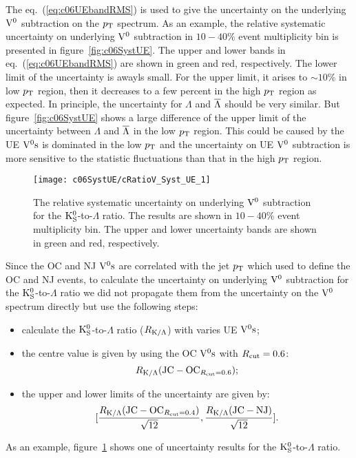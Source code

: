 The eq.~(\ref{eq:c06UEbandRMS}) is used to give the uncertainty on the underlying ${\rm V}^{0}$ subtraction on the $p_{\rm T}$ spectrum.
As an example,
the relative systematic uncertainty on underlying ${\rm V}^{0}$
subtraction in $10-40\%$ event multiplicity bin is presented
in figure~\ref{fig:c06SystUE}.
The upper and lower bands in eq.~(\ref{eq:c06UEbandRMS}) are shown
in green and red, respectively.
The lower limit of the uncertainty is awayls small.
For the upper limit, it arises to $\sim 10\%$ in low $p_{\rm T}$ region,
then it decreases to a few percent in the high $p_{\rm T}$ region as expected.
In principle, the uncertainty for $\Lambda$ and $\overline{\Lambda}$ should be
very similar.
But figure~\ref{fig:c06SystUE} shows a large difference of the upper limit
of the uncertainty between $\Lambda$ and $\overline{\Lambda}$ in the low $p_{\rm T}$ region.
This could be caused by the UE ${\rm V}^{0}{\rm s}$ is dominated in the low $p_{\rm T}$ and
the uncertainty on UE ${\rm V}^{0}$ subtraction is more sensitive to the
statistic fluctuations than that in the high $p_{\rm T}$ region.

\begin{figure}[htb]
\begin{center}
\texttt{[image: c06SystUE/cRatioV\_Syst\_UE\_1]}
\caption{The relative systematic uncertainty on underlying ${\rm V}^{0}$
         subtraction for the ${\rm K}_{\rm S}^{0}$-to-$\Lambda$ ratio.
         The results are shown in $10-40\%$ event multiplicity bin.
         The upper and lower uncertainty bands are shown in green and red,
         respectively.}
\label{fig:c06SystRatioVUE}
\end{center}
\end{figure}

Since the OC and NJ ${\rm V}^{0}{\rm s}$ are correlated with the jet $p_{\rm T}$ which used to
define the OC and NJ events,
to calculate the uncertainty on underlying ${\rm V}^{0}$ subtraction for the
${\rm K}_{\rm S}^{0}$-to-$\Lambda$ ratio we did not propagate them from the uncertainty
on the ${\rm V}^{0}$ spectrum directly but use the following steps:
\begin{itemize}
\item calculate the ${\rm K}_{\rm S}^{0}$-to-$\Lambda$ ratio ($R_{{\rm K}/\Lambda}$) with
      varies UE ${\rm V}^{0}{\rm s}$;
\item the centre value is given by using the OC ${\rm V}^{0}{\rm s}$
      with $R_{\rm cut}=0.6$:
      \begin{equation}
      R_{{\rm K}/\Lambda}({\rm JC}-{\rm OC}_{R_{\rm cut}=0.6});
      \end{equation}
\item the upper and lower limits of the uncertainty are given by:
      \begin{equation}\label{eq:c06SystUERatioV}
      [\frac{R_{{\rm K}/\Lambda}({\rm JC}-{\rm OC}_
            {R_{\rm cut}=0.4})}{\sqrt{12}},
       \frac{R_{{\rm K}/\Lambda}({\rm JC}-{\rm NJ})}{\sqrt{12}}].
      \end{equation}
\end{itemize}
As an example, figure~\ref{fig:c06SystRatioVUE} shows one of uncertainty
results for the ${\rm K}_{\rm S}^{0}$-to-$\Lambda$ ratio.

